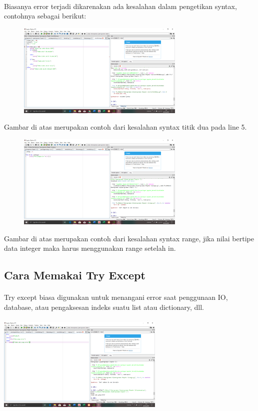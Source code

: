 \documentclass{article}
\begin{document}
\paragraph{}
        Biasanya error terjadi dikarenakan ada kesalahan dalam pengetikan syntax, contohnya sebagai berikut:
        \begin{figure}[h]
        \centerline{\includegraphics[width=8cm]{figures/errortitikdua.png}}
        \end{figure}
        \par Gambar di atas merupakan contoh dari kesalahan syntax titik dua pada line 5.
        \begin{figure}[h]
        \centerline{\includegraphics[width=8cm]{figures/range.png}}
        \end{figure}
        \par Gambar di atas merupakan contoh dari kesalahan syntax range, jika nilai bertipe data integer maka harus menggunakan range setelah in.

\subsection{Cara Memakai Try Except}
\paragraph{}
        Try except biasa digunakan untuk menangani error saat penggunaan IO, database, atau pengaksesan indeks suatu list atau dictionary, dll.
       \paragraph{}
        \centerline{\includegraphics[width=8cm]{figures/tryexcept.png}}
\end{document}
